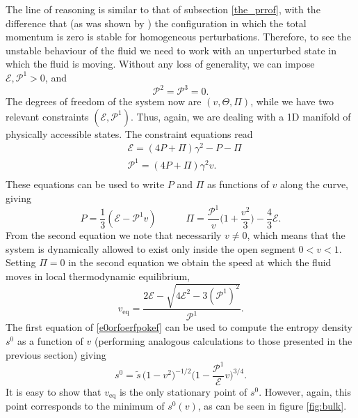 \documentclass[a4paper, amsfonts, amssymb, amsmath, reprint, showkeys, nofootinbib, twoside]{revtex4-1}
\newcommand{\spc}{\quad \quad \quad}
\begin{document}
The line of reasoning is similar to that of subsection \ref{the_prrof}, with the difference that (as was shown by \citet{Hiscock_Insatibility_first_order}) the configuration in which the total momentum is zero is stable for homogeneous perturbations. Therefore, to see the unstable behaviour of the fluid we need to work with an unperturbed state in which the fluid is moving. Without any loss of generality, we can impose $\mathcal{E},\mathcal{P}^1 >0$, and
\begin{equation}
\mathcal{P}^2 = \mathcal{P}^3 =0.
\end{equation}
The degrees of freedom of the system now are $(v,\Theta,\Pi)$, while we have two relevant constraints $(\mathcal{E},\mathcal{P}^1)$. Thus, again, we are dealing with a 1D manifold of physically accessible states. 
The constraint equations read
\begin{equation}\label{syostum}
\begin{split}
& \mathcal{E} = (4P +\Pi) \gamma^2 -P -\Pi  \\
& \mathcal{P}^1 = (4P +\Pi)\gamma^2 v. \\
\end{split}
\end{equation}
These equations can be used to write $P$ and $\Pi$ as functions of $v$ along the curve, giving
\begin{equation}\label{e0orfoerfpokef}
P =\dfrac{1}{3} (\mathcal{E}-\mathcal{P}^1 v)  \spc  \Pi =\dfrac{\mathcal{P}^1}{v} \bigg( 1+\dfrac{v^2}{3} \bigg) -\dfrac{4}{3} \mathcal{E}. 
\end{equation} 
From the second equation we note that necessarily $v\neq 0$, which means that the system is dynamically allowed to exist only inside the open segment $0<v<1$. Setting $\Pi=0$ in the second equation we obtain the speed at which the fluid moves in local thermodynamic equilibrium,
\begin{equation}\label{equiaquil}
v_{\text{eq}} = \dfrac{2\mathcal{E} - \sqrt{4\mathcal{E}^2 - 3(\mathcal{P}^1)^2}}{\mathcal{P}^1}.
\end{equation}
The first equation of \eqref{e0orfoerfpokef} can be used to compute the entropy density $s^0$ as a function of $v$ (performing analogous calculations to those presented in the previous section) giving
\begin{equation}\label{zfuf}
s^0 = \tilde{s} \, \bigg( 1-v^2 \bigg)^{-1/2} \bigg( 1 - \dfrac{\mathcal{P}^1}{\mathcal{E}} v \bigg)^{3/4}.
\end{equation}
It is easy to show that $v_{\text{eq}}$ is the only stationary point of $s^0$. However, again, this point corresponds to the minimum of $s^0(v)$, as can be seen in figure \ref{fig:bulk}.
\end{document}
